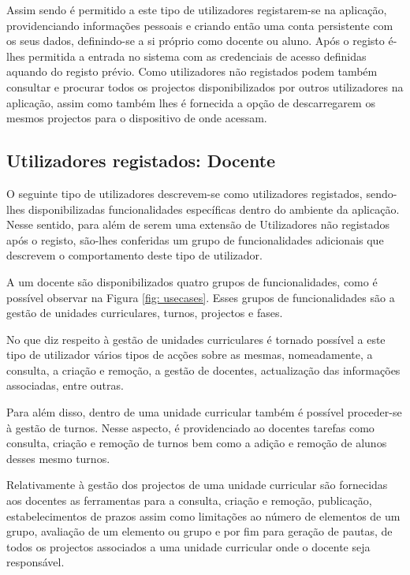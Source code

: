 Assim sendo é permitido a este tipo de utilizadores registarem-se na aplicação, providenciando informações
pessoais e criando então uma conta persistente com os seus dados, definindo-se a si próprio como
docente ou aluno. Após o registo é-lhes permitida a entrada no sistema com as credenciais de acesso
definidas aquando do registo prévio. Como utilizadores não registados podem também consultar e procurar
todos os projectos disponibilizados por outros utilizadores na aplicação, assim como também lhes é fornecida
a opção de descarregarem os mesmos projectos para o dispositivo de onde acessam.

\subsection{Utilizadores registados: Docente}

O seguinte tipo de utilizadores descrevem-se como utilizadores registados, sendo-lhes 
disponibilizadas funcionalidades específicas dentro do ambiente da aplicação. Nesse sentido, para 
além de serem uma extensão de Utilizadores não registados após o registo, são-lhes conferidas um
grupo de funcionalidades adicionais que descrevem o comportamento deste tipo de utilizador.

A um docente são disponibilizados quatro grupos de funcionalidades, como é possível observar na Figura
\ref{fig: usecases}. Esses grupos de funcionalidades são a gestão de unidades curriculares, turnos, 
projectos e fases.

No que diz respeito à gestão de unidades curriculares é tornado possível a este tipo 
de utilizador vários tipos de acções sobre as mesmas, nomeadamente, a consulta, a criação e 
remoção, a gestão de docentes, actualização das informações associadas, entre 
outras.

Para além disso, dentro de uma unidade curricular também é possível proceder-se 
à gestão de turnos. Nesse aspecto, é providenciado ao docentes tarefas como consulta, 
criação e remoção de turnos bem como a adição e remoção de alunos desses mesmo 
turnos.

Relativamente à gestão dos projectos de uma unidade curricular são fornecidas 
aos docentes as ferramentas para a consulta, criação e remoção, publicação, 
estabelecimentos de prazos assim como limitações ao número de elementos de um 
grupo, avaliação de um elemento ou grupo e por fim para geração de pautas, de 
todos os projectos associados a uma unidade curricular onde o docente seja 
responsável.

